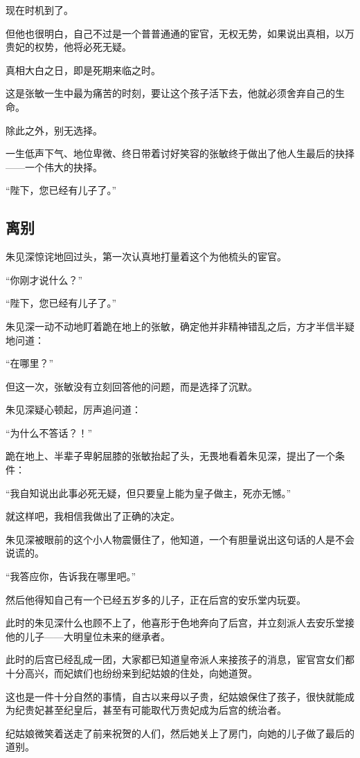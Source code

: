 \begin{multicols}{\theparacolNo}
		现在时机到了。

		但他也很明白，自己不过是一个普普通通的宦官，无权无势，如果说出真相，以万贵妃的权势，他将必死无疑。

		真相大白之日，即是死期来临之时。

		这是张敏一生中最为痛苦的时刻，要让这个孩子活下去，他就必须舍弃自己的生命。

		除此之外，别无选择。

		一生低声下气、地位卑微、终日带着讨好笑容的张敏终于做出了他人生最后的抉择——一个伟大的抉择。

		“陛下，您已经有儿子了。”

		\subsection{离别}
		朱见深惊诧地回过头，第一次认真地打量着这个为他梳头的宦官。

		“你刚才说什么？”

		“陛下，您已经有儿子了。”

		朱见深一动不动地盯着跪在地上的张敏，确定他并非精神错乱之后，方才半信半疑地问道：

		“在哪里？”

		但这一次，张敏没有立刻回答他的问题，而是选择了沉默。

		朱见深疑心顿起，厉声追问道：

		“为什么不答话？！”

		跪在地上、半辈子卑躬屈膝的张敏抬起了头，无畏地看着朱见深，提出了一个条件：

		“我自知说出此事必死无疑，但只要皇上能为皇子做主，死亦无憾。”

		就这样吧，我相信我做出了正确的决定。

		朱见深被眼前的这个小人物震慑住了，他知道，一个有胆量说出这句话的人是不会说谎的。

		“我答应你，告诉我在哪里吧。”

		然后他得知自己有一个已经五岁多的儿子，正在后宫的安乐堂内玩耍。

		此时的朱见深什么也顾不上了，他喜形于色地奔向了后宫，并立刻派人去安乐堂接他的儿子——大明皇位未来的继承者。

		此时的后宫已经乱成一团，大家都已知道皇帝派人来接孩子的消息，宦官宫女们都十分高兴，而妃嫔们也纷纷来到纪姑娘的住处，向她道贺。

		这也是一件十分自然的事情，自古以来母以子贵，纪姑娘保住了孩子，很快就能成为纪贵妃甚至纪皇后，甚至有可能取代万贵妃成为后宫的统治者。

		纪姑娘微笑着送走了前来祝贺的人们，然后她关上了房门，向她的儿子做了最后的道别。


\end{multicols}
